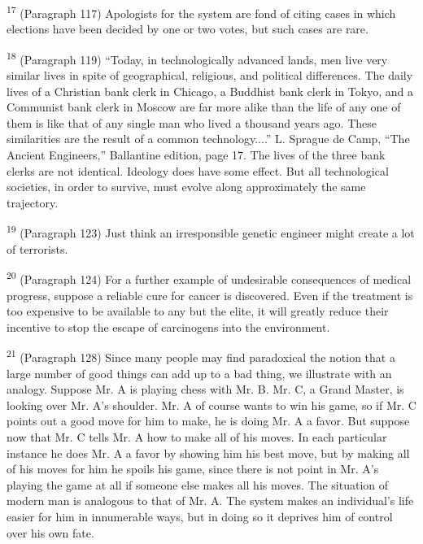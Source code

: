 \documentclass{article}
\begin{document}
\textsuperscript{17}  (Paragraph 117) Apologists for the system are fond of citing cases in which elections have 
been decided by one or two votes, but such cases are rare. \vspace{\baselineskip}

\textsuperscript{18} (Paragraph 119) “Today, in technologically advanced lands, men live very similar lives in spite 
of geographical, religious, and political differences.  The daily lives of a Christian bank clerk in 
Chicago, a Buddhist bank clerk in Tokyo, and a Communist bank clerk in Moscow are far more 
alike than the life of any one of them is like that of any single man who lived a thousand years 
ago.  These similarities are the result of a common technology....” L. Sprague de Camp, “The 
Ancient Engineers,” Ballantine edition, page 17. The lives of the three bank clerks are not 
identical.  Ideology does have some effect.  But all technological societies, in order to survive, 
must evolve along approximately the same trajectory. \vspace{\baselineskip}

\textsuperscript{19} (Paragraph 123) Just think an irresponsible genetic engineer might create a lot of terrorists. \vspace{\baselineskip}

\textsuperscript{20} (Paragraph 124) For a further example of undesirable consequences of medical progress, 
suppose a reliable cure for cancer is discovered.  Even if the treatment is too expensive to be 
available to any but the elite, it will greatly reduce their incentive to stop the escape of 
carcinogens into the environment.  \vspace{\baselineskip}

\textsuperscript{21} (Paragraph 128) Since many people may find paradoxical the notion that a large number of 
good things can add up to a bad thing, we illustrate with an analogy.  Suppose Mr.  A is playing 
chess with Mr.  B. Mr.  C, a Grand Master, is looking over Mr.  A’s shoulder.  Mr.  A of course 
wants to win his game, so if Mr.  C points out a good move for him to make, he is doing Mr.  A a 
favor.  But suppose now that Mr.  C tells Mr.  A how to make all of his moves.  In each 
particular instance he does Mr.  A a favor by showing him his best move, but by making all of 
his moves for him he spoils his game, since there is not point in Mr.  A’s playing the game at all 
if someone else makes all his moves.  The situation of modern man is analogous to that of 
Mr.  A. The system makes an individual’s life easier for him in innumerable ways, but in doing 
so it deprives him of control over his own fate.  \vspace{\baselineskip}
\end{document}
